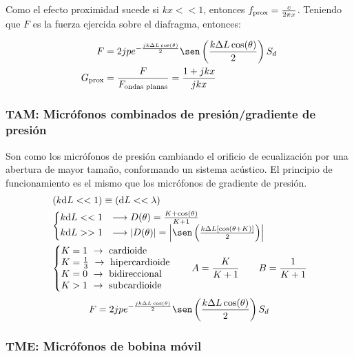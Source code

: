 \documentclass[a4paper, 8pt]{extarticle}
\renewcommand{\sin}{\sen}
\begin{document}
\begin{multicols}{3}
  Como el efecto proximidad sucede si $kx << 1$, entonces $f _{\textnormal{prox}} = \frac{c}{2 \pi x}$. Teniendo que $F$ es la fuerza ejercida sobre el diafragma, entonces:

  \begin{align*}
    F                      & = 2jp e^{- \frac{jk \Delta L \cos (\theta)}{2}} \sin \left( \frac{k \Delta L \cos (\theta)}{2} \right) S_d \\
    G _{\textnormal{prox}} & = \frac{F}{F _{\textnormal{ondas planas}}} = \frac{1 + jkx}{jkx}
  \end{align*}

  \subsubsection{TAM: Micrófonos combinados de presión/gradiente de presión}
  Son como los micrófonos de presión cambiando el orificio de ecualización por una abertura de mayor tamaño, conformando un sistema acústico. El principio de funcionamiento es el mismo que los micrófonos de gradiente de presión.
  \begin{align*}
     & \left( k \dd L << 1 \right) \equiv \left( \dd L << \lambda \right)                                                             \\
     & \left\lbrace
    \begin{matrix*}[l]
      k \dd L << 1 & \longrightarrow D (\theta ) = \frac{K + \cos (\theta)}{K + 1}                                                      \\
      k \dd L >> 1 & \longrightarrow \abs{D (\theta )} = \abs{\sin \left( \frac{k\Delta L \left[ \cos (\theta + K) \right]}{2} \right)}
    \end{matrix*} \right. \\
     & \left\lbrace
    \begin{matrix*}[l]
      K = 1 \ \rightarrow \text{ cardioide} \\
      K = \frac{1}{3} \ \rightarrow \text{ hipercardioide} \\
      K = 0 \ \rightarrow \text{ bidireccional} \\
      K > 1 \ \rightarrow \text{ subcardioide}
    \end{matrix*}
    \right.  \qquad  A = \frac{K}{K + 1} \qquad B = \frac{1}{K + 1}
  \end{align*}
  \[ F = 2jp e^{- \frac{jk \Delta L \cos (\theta)}{2}} \sin \left( \frac{k \Delta L \cos (\theta)}{2} \right) S_d \]

  \subsubsection{TME: Micrófonos de bobina móvil}

\end{multicols}
\end{document}

